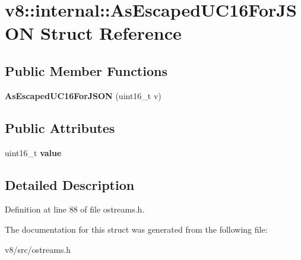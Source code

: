 \hypertarget{structv8_1_1internal_1_1AsEscapedUC16ForJSON}{}\section{v8\+:\+:internal\+:\+:As\+Escaped\+U\+C16\+For\+J\+S\+ON Struct Reference}
\label{structv8_1_1internal_1_1AsEscapedUC16ForJSON}
\subsection*{Public Member Functions}
\begin{DoxyCompactItemize}
\item 
\mbox{\label{structv8_1_1internal_1_1AsEscapedUC16ForJSON_a4d97551c422a243cd107ffe34f830e2c}} 
{\bfseries As\+Escaped\+U\+C16\+For\+J\+S\+ON} (uint16\+\_\+t v)
\end{DoxyCompactItemize}
\subsection*{Public Attributes}
\begin{DoxyCompactItemize}
\item 
\mbox{\label{structv8_1_1internal_1_1AsEscapedUC16ForJSON_a5edc3c77938e90205a97c78c7ffcff05}} 
uint16\+\_\+t {\bfseries value}
\end{DoxyCompactItemize}


\subsection{Detailed Description}


Definition at line 88 of file ostreams.\+h.



The documentation for this struct was generated from the following file\+:\begin{DoxyCompactItemize}
\item 
v8/src/ostreams.\+h\end{DoxyCompactItemize}

